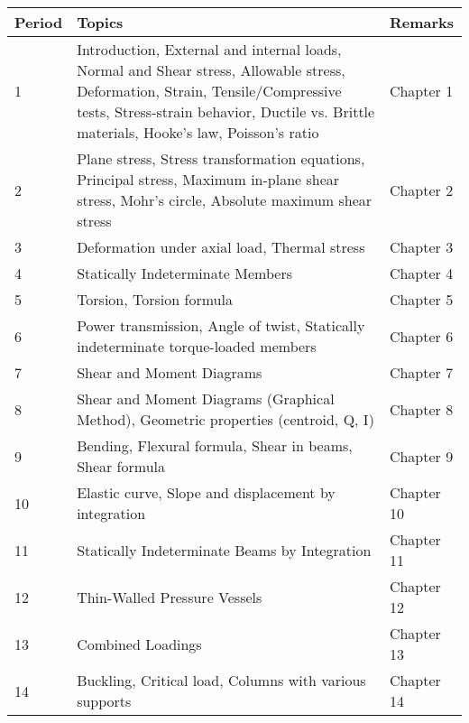 \documentclass{article}
\begin{document}
\begin{enumerate}
\begin{tabularx}{\textwidth}{lXl}
    \toprule
    \textbf{Period} & \textbf{Topics} & \textbf{Remarks} \\
    \midrule
    1 & Introduction, External and internal loads, Normal and Shear stress, Allowable stress, Deformation, Strain, Tensile/Compressive tests, Stress-strain behavior, Ductile vs. Brittle materials, Hooke's law, Poisson's ratio & Chapter 1 \\
    2 & Plane stress, Stress transformation equations, Principal stress, Maximum in-plane shear stress, Mohr's circle, Absolute maximum shear stress & Chapter 2 \\
    3 & Deformation under axial load, Thermal stress & Chapter 3 \\
    4 & Statically Indeterminate Members & Chapter 4 \\
    5 & Torsion, Torsion formula & Chapter 5 \\
    6 & Power transmission, Angle of twist, Statically indeterminate torque-loaded members & Chapter 6 \\
    7 & Shear and Moment Diagrams & Chapter 7 \\
    8 & Shear and Moment Diagrams (Graphical Method), Geometric properties (centroid, Q, I) & Chapter 8 \\
    9 & Bending, Flexural formula, Shear in beams, Shear formula & Chapter 9 \\
    10 & Elastic curve, Slope and displacement by integration & Chapter 10 \\
    11 & Statically Indeterminate Beams by Integration & Chapter 11 \\
    12 & Thin-Walled Pressure Vessels & Chapter 12 \\
    13 & Combined Loadings & Chapter 13 \\
    14 & Buckling, Critical load, Columns with various supports & Chapter 14 \\
    \bottomrule
\end{tabularx}


\end{enumerate}
\end{document}
